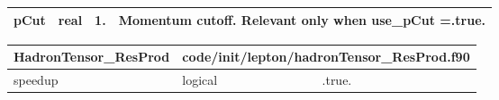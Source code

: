 \documentclass{article}
\begin{document}
\begin{longtable}{llll}
\midrule
pCut & \begin{minipage}[t]{2cm}real\end{minipage} & \begin{minipage}[t]{2cm}1.\end{minipage} & \begin{minipage}[t]{12cm}Momentum cutoff. Relevant only when use\_pCut =.true.\end{minipage}\\*
\bottomrule
\end{longtable}
{ }




\begin{longtable}{llll}
\toprule
\textbf{\large{HadronTensor\_ResProd}} & \multicolumn{3}{l}{\footnotesize{code/init/lepton/hadronTensor\_ResProd.f90}}\\*
\midrule
\endfirsthead
\midrule
\endhead
speedup & \begin{minipage}[t]{2cm}logical\end{minipage} & \begin{minipage}[t]{2cm}.true.\end{minipage} & \begin{minipage}[t]{12cm}\end{minipage}\\*
\bottomrule
\end{longtable}
{ }



\end{document}
